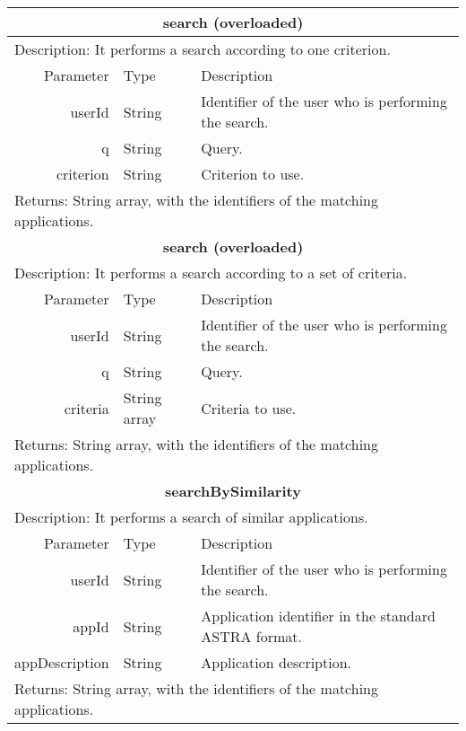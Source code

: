 \begin{table}[h!]
	\small
    \begin{center}
		\begin{tabular}{||r|l|l||}
		
		\hline \hline
		\multicolumn{3}{||c||}{\bfseries{search (overloaded)}} \\
		\hline
		\hline 
		\multicolumn{3}{||l||}{Description: It performs a search according to one
		criterion.} \\ \hline \hline Parameter & Type & Description \\ 
		\hline \hline
			userId & String & Identifier of the user who is performing the search.\\
			q & String & Query. \\
			criterion & String & Criterion to use. \\
		\hline \hline
		\multicolumn{3}{||l||}{Returns: String array, with the identifiers of the
		matching applications.} \\ \hline \hline
	
		\hline \hline
		\multicolumn{3}{||c||}{\bfseries{search (overloaded)}} \\
		\hline
		\hline 
		\multicolumn{3}{||l||}{Description: It performs a search according to a set
		of criteria.} \\ \hline \hline Parameter & Type & Description \\ 
		\hline \hline
			userId & String & Identifier of the user who is performing the search.\\
			q & String & Query. \\
			criteria & String array & Criteria to use. \\
		\hline \hline
		\multicolumn{3}{||l||}{Returns: String array, with the identifiers of the
		matching applications.} \\ \hline \hline
		
		\hline \hline
		\multicolumn{3}{||c||}{\bfseries{searchBySimilarity}} \\
		\hline
		\hline 
		\multicolumn{3}{||l||}{Description: It performs a search of similar
		applications.} \\ \hline \hline Parameter & Type & Description \\ \hline
		\hline userId & String & Identifier of the user who is performing the
		search.\\ 
		appId & String & Application identifier in the standard ASTRA format. \\
			appDescription & String & Application description. \\
		\hline \hline
		\multicolumn{3}{||l||}{Returns: String array, with the identifiers of the
		matching applications.} \\ \hline \hline
		

\end{tabular}
\end{center}
\end{table}
